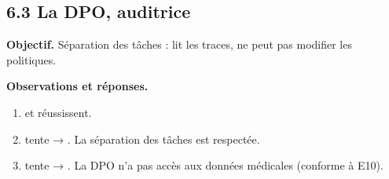 \subsection{6.3 La DPO, auditrice}
\textbf{Objectif.} Séparation des tâches :  lit les traces,  ne peut pas modifier les politiques.


\textbf{Observations et réponses.}
\begin{enumerate}
  \item {} et  réussissent.
  \item {} tente  → . La séparation des tâches est respectée.
  \item {} tente  → . La DPO n'a pas accès aux données médicales (conforme à E10).
\end{enumerate}
